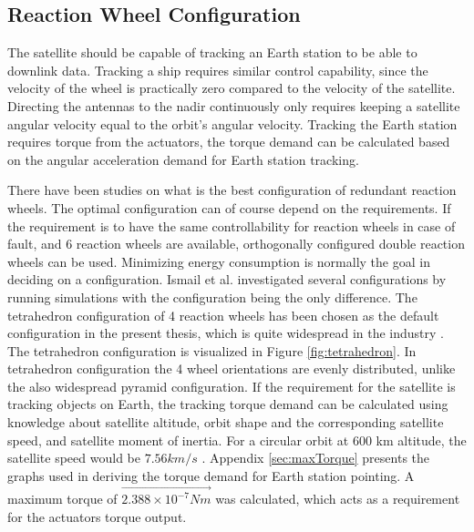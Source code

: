 \subsection{Reaction Wheel Configuration}
The satellite should be capable of tracking an Earth station to be able to downlink data. Tracking a ship requires similar control capability, since the velocity of the wheel is practically zero compared to the velocity of the satellite. Directing the antennas to the nadir continuously only requires keeping a satellite angular velocity equal to the orbit's angular velocity.
Tracking the Earth station requires torque from the actuators, the torque demand can be calculated based on the angular acceleration demand for Earth station tracking.

There have been studies on what is the best configuration of redundant reaction wheels. The optimal configuration can of course depend on the requirements. If the requirement is to have the same controllability for reaction wheels in case of fault, and 6 reaction wheels are available, orthogonally configured double reaction wheels can be used. Minimizing energy consumption is normally the goal in deciding on a configuration. Ismail et al. \cite{ReactionWheelConfigSim} investigated several configurations by running simulations with the configuration being the only difference. The tetrahedron configuration of 4 reaction wheels has been chosen as the default configuration in the present thesis, which is quite widespread in the industry \cite{reactConfigNasa}. The tetrahedron configuration is visualized in Figure \ref{fig:tetrahedron}.
In tetrahedron configuration the 4 wheel orientations are evenly distributed, unlike the also widespread pyramid configuration. 
If the requirement for the satellite is tracking objects on Earth, the tracking torque demand can be calculated using knowledge about satellite altitude, orbit shape and the corresponding satellite speed, and satellite moment of inertia. For a circular orbit at 600 km altitude, the satellite speed would be $7.56 km/s$ \cite{satSpeed}. Appendix \ref{sec:maxTorque} presents the graphs used in deriving the torque demand for Earth station pointing. A maximum torque of $\vec{2.388 \times 10^{-7} Nm}$ was calculated, which acts as a requirement for the actuators torque output.

